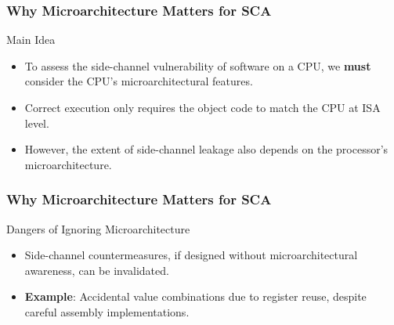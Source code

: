 \begin{frame}
    \frametitle{Why Microarchitecture Matters for SCA}
    \begin{block}{Main Idea} 
        \begin{itemize}
            \item To assess the side-channel vulnerability of software on a CPU, we \textbf{must} consider the CPU's microarchitectural features.
            \item Correct execution only requires the object code to match the CPU at ISA level.
            \item However, the extent of side-channel leakage also depends on the processor's microarchitecture.
        \end{itemize}
    \end{block}
\end{frame}

\begin{frame}
    \frametitle{Why Microarchitecture Matters for SCA}
    \begin{block}{Dangers of Ignoring Microarchitecture}
        \begin{itemize}
            \item Side-channel countermeasures, if designed without microarchitectural awareness, can be invalidated.
            \item \textbf{Example}: Accidental value combinations due to register reuse, despite careful assembly implementations.
        \end{itemize}
    \end{block}
\end{frame}

